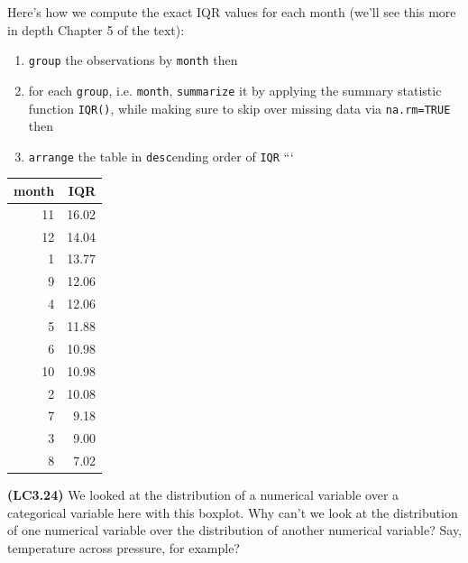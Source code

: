 \documentclass[12pt,]{krantz}
\makeatletter
\newenvironment{Shaded}{\begin{snugshade}}{\end{snugshade}}
\newcommand{\KeywordTok}[1]{\textcolor[rgb]{0.27,0.27,0.27}{\textbf{#1}}}
\newcommand{\DataTypeTok}[1]{\textcolor[rgb]{0.27,0.27,0.27}{#1}}
\newcommand{\StringTok}[1]{\textcolor[rgb]{0.5,0.5,0.5}{#1}}
\newcommand{\OtherTok}[1]{\textcolor[rgb]{0.37,0.37,0.37}{#1}}
\newcommand{\OperatorTok}[1]{\textcolor[rgb]{0.43,0.43,0.43}{\textbf{#1}}}
\newcommand{\NormalTok}[1]{#1}
\providecommand{\tightlist}{%
  \setlength{\itemsep}{0pt}\setlength{\parskip}{0pt}}
\newenvironment{kframe}{%
\medskip{}
\setlength{\fboxsep}{.8em}
 \def\at@end@of@kframe{}%
 \ifinner\ifhmode%
  \def\at@end@of@kframe{\end{minipage}}%
  \begin{minipage}{\columnwidth}%
 \fi\fi%
 \def\FrameCommand##1{\hskip\@totalleftmargin \hskip-\fboxsep
 \colorbox{shadecolor}{##1}\hskip-\fboxsep
     \hskip-\linewidth \hskip-\@totalleftmargin \hskip\columnwidth}%
 \MakeFramed {\advance\hsize-\width
   \@totalleftmargin\z@ \linewidth\hsize
   \@setminipage}}%
 {\par\unskip\endMakeFramed%
 \at@end@of@kframe}
\renewenvironment{Shaded}{\begin{kframe}}{\end{kframe}}
\theoremstyle{definition}
\theoremstyle{definition}
\theoremstyle{definition}
\theoremstyle{remark}
\makeatother
\begin{document}
Here's how we compute the exact IQR values for each month (we'll see
this more in depth Chapter 5 of the text):

\begin{enumerate}
\def\labelenumi{\arabic{enumi}.}
\tightlist
\item
  \texttt{group} the observations by \texttt{month} then
\item
  for each \texttt{group}, i.e. \texttt{month}, \texttt{summarize} it by
  applying the summary statistic function \texttt{IQR()}, while making
  sure to skip over missing data via \texttt{na.rm=TRUE} then
\item
  \texttt{arrange} the table in \texttt{desc}ending order of
  \texttt{IQR} ```
\end{enumerate}

\begin{Shaded}
\end{Shaded}

\begin{tabular}{r|r}
\hline
month & IQR\\
\hline
11 & 16.02\\
\hline
12 & 14.04\\
\hline
1 & 13.77\\
\hline
9 & 12.06\\
\hline
4 & 12.06\\
\hline
5 & 11.88\\
\hline
6 & 10.98\\
\hline
10 & 10.98\\
\hline
2 & 10.08\\
\hline
7 & 9.18\\
\hline
3 & 9.00\\
\hline
8 & 7.02\\
\hline
\end{tabular}

\textbf{(LC3.24)} We looked at the distribution of a numerical variable
over a categorical variable here with this boxplot. Why can't we look at
the distribution of one numerical variable over the distribution of
another numerical variable? Say, temperature across pressure, for
example?
\end{document}
